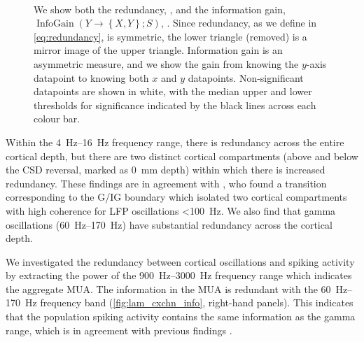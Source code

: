 \begin{figure}[htbp]
    \centering
    \hspace*{\fill}
    \hspace*{\fill}
    \\
    \hspace*{\fill}
    \hspace*{\fill}
%
\caption{
We show both the redundancy, \protect{}, and the information gain, $\operatorname{InfoGain}\left(Y\to\left\{X,Y\right\};S\right)$, \protect{}.
Since redundancy, as we define in \autoref{eq:redundancy}, is symmetric, the lower triangle (removed) is a mirror image of the upper triangle.
Information gain is an asymmetric measure, and we show the gain from knowing the $y$-axis datapoint to knowing both $x$ and $y$ datapoints.
Non-significant datapoints are shown in white, with the median upper and lower thresholds for significance indicated by the black lines across each colour bar.
}%
\label{fig:lam_cxchn_info}
%
\end{figure}

Within the \SIrange{4}{16}{Hz} frequency range, there is redundancy across the entire cortical depth, but there are two distinct cortical compartments (above and below the \ac{CSD} reversal, marked as \SI{0}{mm} depth) within which there is increased redundancy.
These findings are in agreement with \citet{Maier2010}, who found a transition corresponding to the \ac{G}/\ac{IG} boundary which isolated two cortical compartments with high coherence for \ac{LFP} oscillations \SI{<100}{Hz}.
We also find that gamma oscillations (\SIrange{60}{170}{Hz}) have substantial redundancy across the cortical depth.

We investigated the redundancy between cortical oscillations and spiking activity by extracting the power of the \SIrange{900}{3000}{Hz} frequency range which indicates the aggregate \acf{MUA}.
The information in the \ac{MUA} is redundant with the \SIrange{60}{170}{Hz} frequency band (\autoref{fig:lam_cxchn_info}, right-hand panels).
This indicates that the population spiking activity contains the same information as the gamma range, which is in agreement with previous findings \citep{Belitski2008}.

